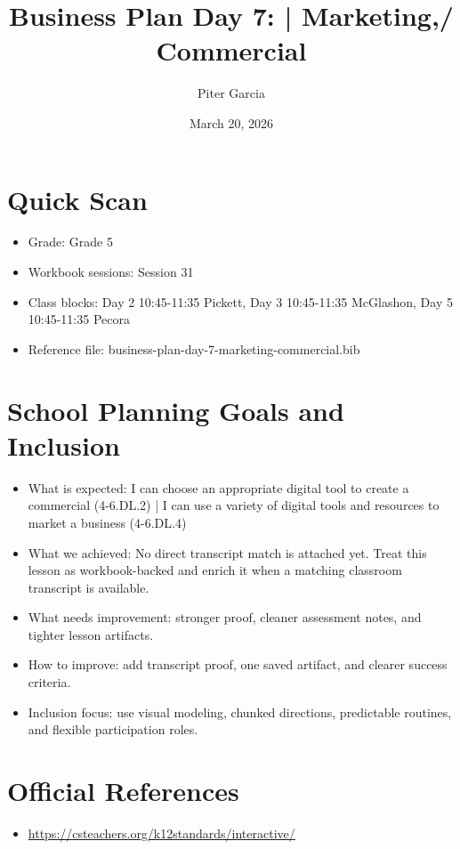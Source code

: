 \documentclass[11pt]{article}
\title{Business Plan Day 7: | Marketing,/ Commercial}
\author{Piter Garcia}
\date{March 20, 2026}
\begin{document}
\maketitle
\section*{Quick Scan}
\begin{itemize}[leftmargin=*]
\item Grade: Grade 5
\item Workbook sessions: Session 31
\item Class blocks: Day 2 10:45-11:35 Pickett, Day 3 10:45-11:35 McGlashon, Day 5 10:45-11:35 Pecora
\item Reference file: business-plan-day-7-marketing-commercial.bib
\end{itemize}
\section*{School Planning Goals and Inclusion}
\begin{itemize}[leftmargin=*]
\item What is expected: I can choose an appropriate digital tool to create a commercial (4-6.DL.2) | I can use a variety of digital tools and resources to market a business (4-6.DL.4)
\item What we achieved: No direct transcript match is attached yet. Treat this lesson as workbook-backed and enrich it when a matching classroom transcript is available.
\item What needs improvement: stronger proof, cleaner assessment notes, and tighter lesson artifacts.
\item How to improve: add transcript proof, one saved artifact, and clearer success criteria.
\item Inclusion focus: use visual modeling, chunked directions, predictable routines, and flexible participation roles.
\end{itemize}
\section*{Official References}
\begin{itemize}[leftmargin=*]
\item \url{https://csteachers.org/k12standards/interactive/}

\end{itemize}
\end{document}
